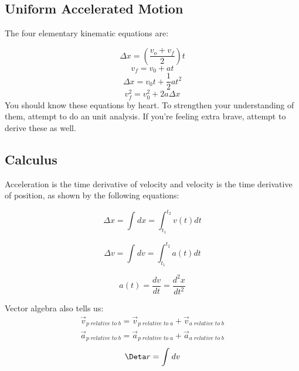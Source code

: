 \subsection{Uniform Accelerated Motion}
The four elementary kinematic equations are:

	\begin{equation}\Delta x = (\frac{v_o + v_f}{2})t\end{equation}
	\begin{equation}v_f = v_0 + at\end{equation}
	\begin{equation}\Delta x = v_0t + \frac{1}{2}at^2\end{equation}
	\begin{equation}v_f^2 = v_0^2 + 2a\Delta x\end{equation}
You should know these equations by heart. To strengthen your understanding of them, attempt to do an unit analysis. If you're feeling extra brave, attempt to derive these as well.

\subsection{Calculus}
Acceleration is the time derivative of velocity and velocity is the time derivative of position, as shown by the following equations:

    \begin{equation}
    \Delta x = \int_{ }^{ }dx = \int_{t_1}^{t_2} v(t) dt
    \end{equation}
    
    \begin{equation}
    \Delta v = \int_{ }^{ }dv = \int_{t_1}^{t_2} a(t) dt
    \end{equation}
    
    \begin{equation}
    a(t) = \frac{dv}{dt}=\frac{d^2x}{dt^2}
    \end{equation}
    
Vector algebra also tells us:
    \begin{equation}
    \begin{split}
        \vec{v}_{p\;relative\;to\;b} = 
        \vec{v}_{p\;relative\;to\;a} + \vec{v}_{a\;relative\;to\;b}
        \\
        \vec{a}_{p\;relative\;to\;b} = 
        \vec{a}_{p\;relative\;to\;a} + \vec{a}_{a\;relative\;to\;b}
    \end{split}
    \end{equation}
    \begin{equation*}
        \Deta r = \int_{ }^{ }dv
    \end{equation*}
    
